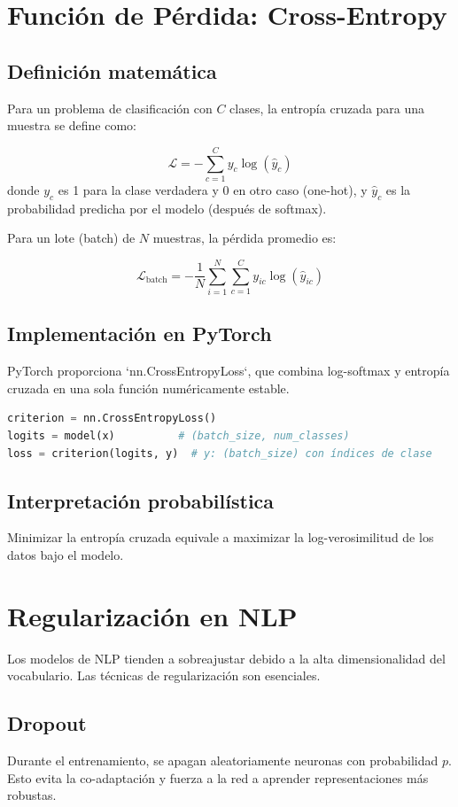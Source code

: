 \documentclass[12pt,a4paper,openany,oneside]{book}
\begin{document}
\section{Función de Pérdida: Cross-Entropy}

\subsection{Definición matemática}
Para un problema de clasificación con \(C\) clases, la entropía cruzada para una muestra se define como:

\[
\mathcal{L} = -\sum_{c=1}^C y_c \log(\hat{y}_c)
\]
donde \(y_c\) es 1 para la clase verdadera y 0 en otro caso (one-hot), y \(\hat{y}_c\) es la probabilidad predicha por el modelo (después de softmax).

Para un lote (batch) de \(N\) muestras, la pérdida promedio es:

\[
\mathcal{L}_{\text{batch}} = -\frac{1}{N} \sum_{i=1}^N \sum_{c=1}^C y_{ic} \log(\hat{y}_{ic})
\]

\subsection{Implementación en PyTorch}
PyTorch proporciona `nn.CrossEntropyLoss`, que combina log-softmax y entropía cruzada en una sola función numéricamente estable.

\begin{lstlisting}[language=Python]
criterion = nn.CrossEntropyLoss()
logits = model(x)          # (batch_size, num_classes)
loss = criterion(logits, y)  # y: (batch_size) con índices de clase
\end{lstlisting}

\subsection{Interpretación probabilística}
Minimizar la entropía cruzada equivale a maximizar la log-verosimilitud de los datos bajo el modelo.

\section{Regularización en NLP}

Los modelos de NLP tienden a sobreajustar debido a la alta dimensionalidad del vocabulario. Las técnicas de regularización son esenciales.

\subsection{Dropout}
Durante el entrenamiento, se apagan aleatoriamente neuronas con probabilidad \(p\). Esto evita la co-adaptación y fuerza a la red a aprender representaciones más robustas.
\end{document}
